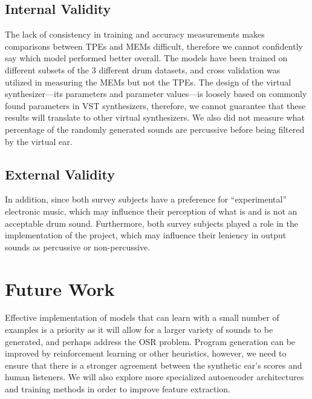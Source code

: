 \documentclass[\main/thesis.tex]{subfiles}
\begin{document}
\subsection{Internal Validity}
 The lack of consistency in training and accuracy measurements makes comparisons between TPEs and MEMs difficult, therefore we cannot confidently say which model performed better overall. The models have been trained on different subsets of the 3 different drum datasets, and cross validation was utilized in measuring the MEMs but not the TPEs. The design of the virtual synthesizer---its parameters and parameter values---is loosely based on commonly found parameters in VST synthesizers, therefore, we cannot guarantee that these results will translate to other virtual synthesizers. We also did not measure what percentage of the randomly generated sounds are percussive before being filtered by the virtual ear. 
\subsection{External Validity}
 In addition, since both survey subjects have a preference for \enquote{experimental} electronic music, which may influence their perception of what is and is not an acceptable drum sound. Furthermore, both survey subjects played a role in the implementation of the project, which may influence their leniency in output sounds as percussive or non-percussive. 

  
\section{Future Work} Effective implementation of models that can learn with a small number of examples is a priority as it will allow for a larger variety of sounds to be generated, and perhaps address the OSR problem. Program generation can be improved by reinforcement learning or other heuristics, however, we need to ensure that there is a stronger agreement between the synthetic ear's scores and human listeners. We will also explore more specialized autoencoder architectures and training methods in order to improve feature extraction.
\end{document}
